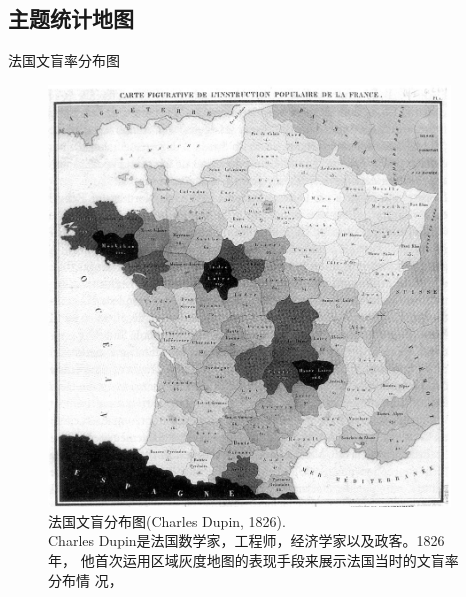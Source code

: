 \documentclass{beamerthemeMono}
\begin{document}
\subsection{主题统计地图}
\begin{frame}{\subsecname}{法国文盲率分布图}

  \begin{figure}
    \begin{columns}
      \begin{column}{.6\textwidth}
        \includegraphics[width=\columnwidth]{法国文盲分布图.jpg}
      \end{column}

      \begin{column}{.35\textwidth}
        \centering
        \caption{法国文盲分布图(Charles Dupin, 1826). \\
          Charles Dupin是法国数学家，工程师，经济学家以及政客。1826年，
          他首次运用区域灰度地图的表现手段来展示法国当时的文盲率分布情
          况，}
      \end{column}
    \end{columns}
  \end{figure}

\end{frame}
\end{document}
